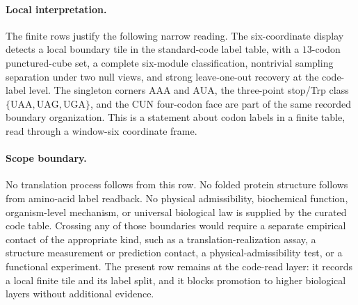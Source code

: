 \paragraph{Local interpretation.}
The finite rows justify the following narrow reading. The six-coordinate display detects a local boundary tile in the standard-code label table, with a $13$-codon punctured-cube set, a complete six-module classification, nontrivial sampling separation under two null views, and strong leave-one-out recovery at the code-label level. The singleton corners $\mathrm{AAA}$ and $\mathrm{AUA}$, the three-point stop/Trp class $\{\mathrm{UAA},\mathrm{UAG},\mathrm{UGA}\}$, and the CUN four-codon face are part of the same recorded boundary organization. This is a statement about codon labels in a finite table, read through a window-six coordinate frame.

\paragraph{Scope boundary.}
No translation process follows from this row. No folded protein structure follows from amino-acid label readback. No physical admissibility, biochemical function, organism-level mechanism, or universal biological law is supplied by the curated code table. Crossing any of those boundaries would require a separate empirical contact of the appropriate kind, such as a translation-realization assay, a structure measurement or prediction contact, a physical-admissibility test, or a functional experiment. The present row remains at the code-read layer: it records a local finite tile and its label split, and it blocks promotion to higher biological layers without additional evidence.
